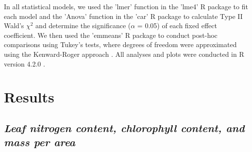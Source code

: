 In all statistical models, we used the 'lmer' function in the 'lme4' R package  to fit each model and the 'Anova' function in the 'car' R package  to calculate Type II Wald's $\chi^{2}$ and determine the significance ($\alpha$ = 0.05) of each fixed effect coefficient. We then used the 'emmeans' R package  to conduct post-hoc comparisons using Tukey's tests, where degrees of freedom were approximated using the Kenward-Roger approach . All analyses and plots were conducted in R version 4.2.0 .

\section{Results}
\subsection{\textit{Leaf nitrogen content, chlorophyll content, and mass per area}}

